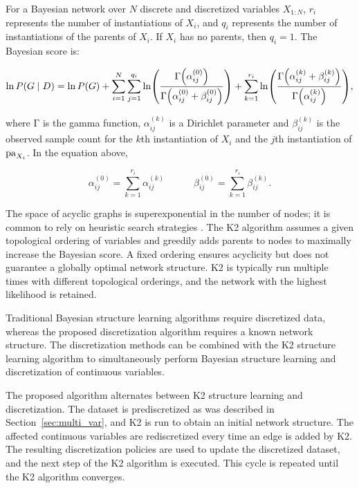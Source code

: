 For a Bayesian network over $N$ discrete and discretized variables $X_{1:N}$, $r_i$ represents the number of instantiations of $X_i$, and $q_i$ represents the number of instantiations of the parents of $X_i$.
If $X_i$ has no parents, then $q_i = 1$.
The Bayesian score is:

\begin{small}
\begin{equation}
\label{eq:BayesianScore}
  \ln P(G\mid D) = \ln P(G) + \sum_{i=1}^N \sum_{j=1}^{q_i} \ln \paren{
    \frac{
      \mathrm{\Gamma}\paren{\alpha_{ij}^{(0)}}
    }{
      \mathrm{\Gamma}\paren{\alpha_{ij}^{(0)} + \beta_{ij}^{(0)}}
    }
  } + \sum_{k=1}^{r_i} \ln \paren{
    \frac{
      \mathrm{\Gamma}\paren{\alpha_{ij}^{(k)} + \beta_{ij}^{(k)}}
    }{
      \mathrm{\Gamma}\paren{\alpha_{ij}^{(k)}}
    }
  }\text{,}
\end{equation}
\end{small}

\noindent
where $\mathrm{\Gamma}$ is the gamma function, $\alpha_{ij}^{(k)}$ is a Dirichlet parameter and $\beta_{ij}^{(k)}$ is the observed sample count for the $k$th instantiation of $X_i$ and the $j$th instantiation of $\operatorname{pa}_{X_i}$.
In the equation above,

\begin{equation}
\alpha_{ij}^{(0)} = \sum_{k=1}^{r_i} \alpha_{ij}^{(k)} \quad \qquad \beta_{ij}^{(0)} = \sum_{k=1}^{r_i} \beta_{ij}^{(k)}\text{.}
\end{equation}

The space of acyclic graphs is superexponential in the number of nodes; it is common to rely on heuristic search strategies \citep{PGM_2009}.
The K2 algorithm assumes a given topological ordering of variables and greedily adds parents to nodes to maximally increase the Bayesian score.
A fixed ordering ensures acyclicity but does not guarantee a globally optimal network structure.
K2 is typically run multiple times with different topological orderings, and the network with the highest likelihood is retained.

Traditional Bayesian structure learning algorithms require discretized data, whereas the proposed discretization algorithm requires a known network structure.
The discretization methods can be combined with the K2 structure learning algorithm \citep{cooper1992bayesian} to simultaneously perform Bayesian structure learning and discretization of continuous variables.

The proposed algorithm alternates between K2 structure learning and discretization.
The dataset is prediscretized as was described in Section~\ref{sec:multi_var}, and K2 is run to obtain an initial network structure.
The affected continuous variables are rediscretized every time an edge is added by K2.
The resulting discretization policies are used to update the discretized dataset, and the next step of the K2 algorithm is executed.
This cycle is repeated until the K2 algorithm converges.

